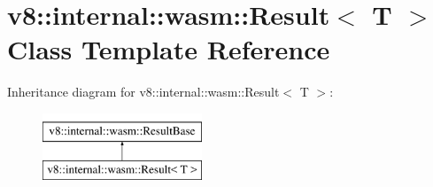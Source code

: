 \hypertarget{classv8_1_1internal_1_1wasm_1_1Result}{}\section{v8\+:\+:internal\+:\+:wasm\+:\+:Result$<$ T $>$ Class Template Reference}
\label{classv8_1_1internal_1_1wasm_1_1Result}
Inheritance diagram for v8\+:\+:internal\+:\+:wasm\+:\+:Result$<$ T $>$\+:\begin{figure}[H]
\begin{center}
\leavevmode
\includegraphics[height=2.000000cm]{classv8_1_1internal_1_1wasm_1_1Result}
\end{center}
\end{figure}
